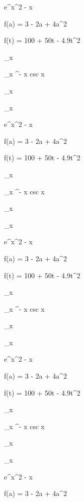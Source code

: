 \documentclass[11pt,a4paper]{article}
\begin{document}
 

 e^{x^2 - x}

f(a) = 3 - 2a + 4a^2

f(t) = 100 + 50t - 4.9t^2

\lim_{x } 

\lim_{x \pi^-} x csc x

\lim_{x } 

\lim_{x } 

 

 e^{x^2 - x}

f(a) = 3 - 2a + 4a^2

f(t) = 100 + 50t - 4.9t^2

\lim_{x } 

\lim_{x \pi^-} x csc x

\lim_{x } 

\lim_{x } 

 

 e^{x^2 - x}

f(a) = 3 - 2a + 4a^2

f(t) = 100 + 50t - 4.9t^2

\lim_{x } 

\lim_{x \pi^-} x csc x

\lim_{x } 

\lim_{x } 

 

 e^{x^2 - x}

f(a) = 3 - 2a + 4a^2

f(t) = 100 + 50t - 4.9t^2

\lim_{x } 

\lim_{x \pi^-} x csc x

\lim_{x } 

\lim_{x } 

 

 e^{x^2 - x}

f(a) = 3 - 2a + 4a^2
\end{document}
